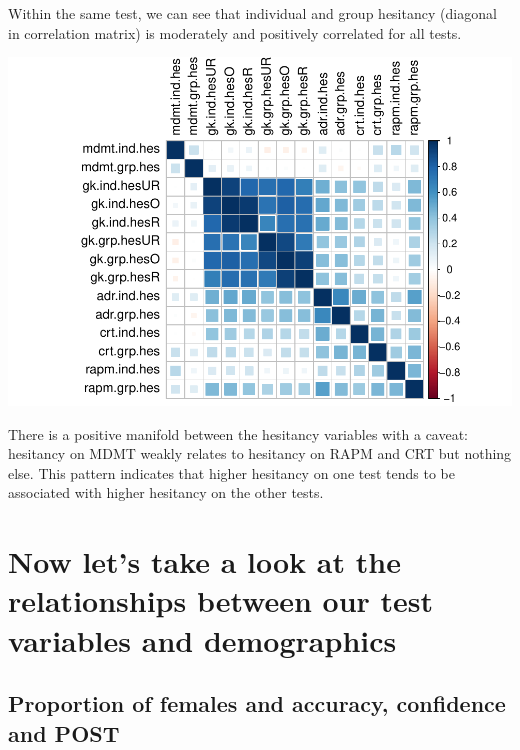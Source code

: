 \documentclass[]{article}
\begin{document}
Within the same test, we can see that individual and group hesitancy
(diagonal in correlation matrix) is moderately and positively correlated
for all tests.

\includegraphics{corr_analyses_files/figure-latex/hesitancy2-1.pdf}

There is a positive manifold between the hesitancy variables with a
caveat: hesitancy on MDMT weakly relates to hesitancy on RAPM and CRT
but nothing else. This pattern indicates that higher hesitancy on one
test tends to be associated with higher hesitancy on the other tests.

\section{Now let's take a look at the relationships between our test
variables and
demographics}\label{now-lets-take-a-look-at-the-relationships-between-our-test-variables-and-demographics}

\subsection{Proportion of females and accuracy, confidence and
POST}\label{proportion-of-females-and-accuracy-confidence-and-post}
\end{document}
